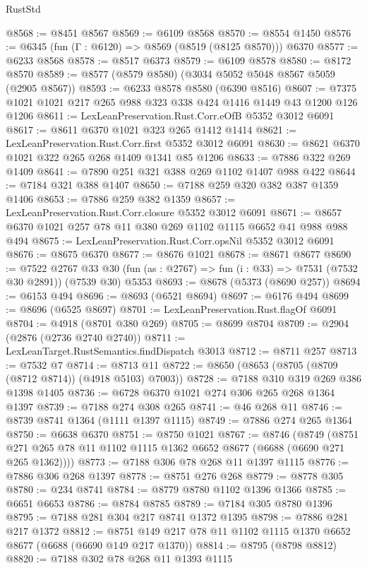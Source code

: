 \begin{lexlean}{RustStd}
\begin{coremodule}
@8568 := @8451 @8567
@8569 := @6109 @8568
@8570 := @8554 @1450
@8576 := @6345 (fun (Γ : @6120) => @8569 (@8519 (@8125 @8570))) @6370
@8577 := @6233 @8568
@8578 := @8517 @6373
@8579 := @6109 @8578
@8580 := @8172 @8570
@8589 := @8577 (@8579 @8580) (@3034 @5052 @5048 @8567 @5059 (@2905 @8567))
@8593 := @6233 @8578 @8580 (@6390 @8516)
@8607 := @7375 @1021 @1021 @217 @265 @988 @323 @338 @424 @1416 @1449 @43 @1200 @126 @1206
@8611 := LexLeanPreservation.Rust.Corr.eOfB @5352 @3012 @6091
@8617 := @8611 @6370 @1021 @323 @265 @1412 @1414
@8621 := LexLeanPreservation.Rust.Corr.first @5352 @3012 @6091
@8630 := @8621 @6370 @1021 @322 @265 @268 @1409 @1341 @85 @1206
@8633 := @7886 @322 @269 @1409
@8641 := @7890 @251 @321 @388 @269 @1102 @1407 @988 @422
@8644 := @7184 @321 @388 @1407
@8650 := @7188 @259 @320 @382 @387 @1359 @1406
@8653 := @7886 @259 @382 @1359
@8657 := LexLeanPreservation.Rust.Corr.closure @5352 @3012 @6091
@8671 := @8657 @6370 @1021 @257 @78 @11 @380 @269 @1102 @1115 @6652 @41 @988 @988 @494
@8675 := LexLeanPreservation.Rust.Corr.opsNil @5352 @3012 @6091
@8676 := @8675 @6370
@8677 := @8676 @1021
@8678 := @8671 @8677
@8690 := @7522
    @2767
    @33
    @30
    (fun (as : @2767) => fun (i : @33) => @7531 (@7532 @30 @2891))
    (@7539 @30)
    @5353
@8693 := @8678 (@5373 (@8690 @257))
@8694 := @6153 @494
@8696 := @8693 (@6521 @8694)
@8697 := @6176 @494
@8699 := @8696 (@6525 @8697)
@8701 := LexLeanPreservation.Rust.flagOf @6091
@8704 := @4918 (@8701 @380 @269)
@8705 := @8699 @8704
@8709 := @2904 (@2876 (@2736 @2740 @2740))
@8711 := LexLeanTarget.RustSemantics.findDispatch @3013
@8712 := @8711 @257
@8713 := @7532 @7
@8714 := @8713 @11
@8722 := @8650 (@8653 (@8705 (@8709 (@8712 @8714)) (@4918 @5103) @7003))
@8728 := @7188 @310 @319 @269 @386 @1398 @1405
@8736 := @6728 @6370 @1021 @274 @306 @265 @268 @1364 @1397
@8739 := @7188 @274 @308 @265
@8741 := @46 @268 @11
@8746 := @8739 @8741 @1364 (@1111 @1397 @1115)
@8749 := @7886 @274 @265 @1364
@8750 := @6638 @6370
@8751 := @8750 @1021
@8767 := @8746
    (@8749 (@8751 @271 @265 @78 @11 @1102 @1115 @1362 @6652 @8677 (@6688 (@6690 @271 @265 @1362))))
@8773 := @7188 @306 @78 @268 @11 @1397 @1115
@8776 := @7886 @306 @268 @1397
@8778 := @8751 @276 @268
@8779 := @8778 @305
@8780 := @234 @8741
@8784 := @8779 @8780 @1102 @1396 @1366
@8785 := @6651 @6653
@8786 := @8784 @8785
@8789 := @7184 @305 @8780 @1396
@8795 := @7188 @281 @304 @217 @8741 @1372 @1395
@8798 := @7886 @281 @217 @1372
@8812 := @8751 @149 @217 @78 @11 @1102 @1115 @1370 @6652 @8677 (@6688 (@6690 @149 @217 @1370))
@8814 := @8795 (@8798 @8812)
@8820 := @7188 @302 @78 @268 @11 @1393 @1115

\end{coremodule}
\end{lexlean}
